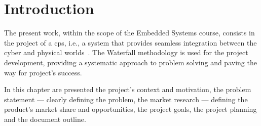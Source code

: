 %
%
%
\chapter{Introduction}%
\label{ch:introduction}
The present work, within the scope of the Embedded Systems course, consists in
the project of a \gls{cps}, i.e., a system that provides
seamless integration between the cyber and physical worlds~\cite{TaoCPS}. The
Waterfall methodology is used for the project development, providing a
systematic approach to problem solving and paving the way for project's success.

In this chapter are presented the project's context and
motivation, the problem statement --- clearly defining the problem, the market
research --- defining the product's market share and opportunities, the project goals, the project planning and the document outline.
%
%
%






%

